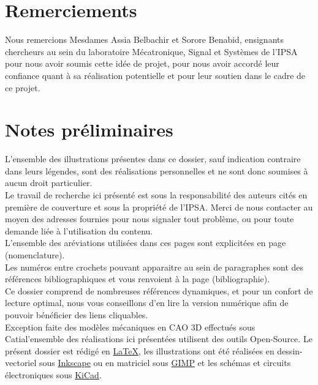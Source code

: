 \documentclass[11pt]{article}
\begin{document}


\setcounter{secnumdepth}{5}
\setcounter{tocdepth}{5}

\newpage
\tableofcontents
\newpage
{}

\section*{Remerciements}

	Nous remercions Mesdames Assia Belbachir et Sorore Benabid, ensignants chercheurs au sein du laboratoire Mécatronique, Signal et Systèmes de l'IPSA pour nous avoir soumis cette idée de projet, pour nous avoir accordé leur confiance quant à sa réalisation potentielle et pour leur soutien dans le cadre de ce projet.

	\vspace{80pt}

\section*{Notes préliminaires}
	L'ensemble des illustrations présentes dans ce dossier, sauf indication contraire dans leurs légendes, sont des réalisations personnelles et ne sont donc soumises à aucun droit particulier.\\

	Le travail de recherche ici présenté est sous la responsabilité des auteurs cités en première de couverture et sous la propriété de l'IPSA. Merci de nous contacter au moyen des adresses fournies pour nous signaler tout problème, ou pour toute demande liée à l'utilisation du contenu.\\

	L'ensemble des aréviations utilisées dans ces pages sont explicitées en page \pageref{nomenclature} (nomenclature).\\

	Les numéros entre crochets pouvant apparaitre au sein de paragraphes sont des références bibliographiques et vous renvoient à la page \pageref{bibliographie} (bibliographie).\\

	Ce dossier comprend de nombreuses références dynamiques, et pour un confort de lecture optimal, nous vous conseillons d'en lire la version numérique afin de pouvoir bénéficier des liens cliquables.\\

	Exception faite des modèles mécaniques en CAO 3D effectués sous Catia\textregistered l'ensemble des réalisations ici présentées utilisent des outils Open-Source. Le présent dossier est rédigé en \href{https://www.latex-project.org/}{\LaTeX}, les illustrations ont été réalisées en dessin-vectoriel sous \href{https://inkscape.org/fr/}{Inkscape} ou en matriciel sous \href{https://www.gimp.org/}{GIMP} et les schémas et circuits électroniques sous \href{http://kicad-pcb.org/}{KiCad}.
\end{document}
